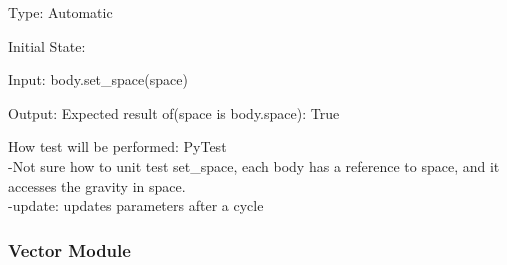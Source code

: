 \documentclass[12pt, titlepage]{article}
\begin{document}
\begin{enumerate}
Type: Automatic

Initial State: 

Input: body.set\_space(space)

Output: Expected result of(space is body.space): True

How test will be performed: PyTest\\

{-Not sure how to unit test set\_space, each body has a reference to space, and it accesses the gravity in space.\\
-update: updates parameters after a cycle\\}
\end{enumerate}

\subsubsection{Vector Module}
\end{document}
